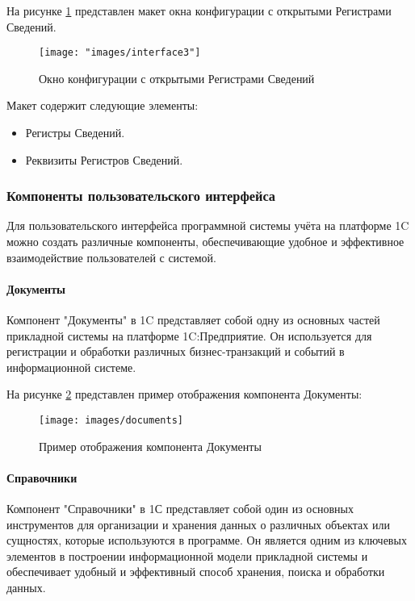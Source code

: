 На рисунке \ref{fig:-interface3} представлен макет окна конфигурации с открытыми Регистрами Сведений.
\begin{figure}
	\centering
	\texttt{[image: "images/interface3"]}
	\caption{Окно конфигурации с открытыми Регистрами Сведений}
	\label{fig:-interface3}
\end{figure}

Макет содержит следующие элементы:
\begin{itemize}
	\item Регистры Сведений.
	\item Реквизиты Регистров Сведений.
\end{itemize}

\subsubsection{Компоненты пользовательского интерфейса}

Для пользовательского интерфейса программной системы учёта на платформе 1C можно создать различные компоненты, обеспечивающие удобное и эффективное взаимодействие пользователей с системой.

\paragraph{Документы}

Компонент "Документы" в 1C представляет собой одну из основных частей прикладной системы на платформе 1C:Предприятие. Он используется для регистрации и обработки различных бизнес-транзакций и событий в информационной системе.

На рисунке \ref{fig:documents} представлен пример отображения компонента Документы:
\begin{figure}
	\centering
	\texttt{[image: images/documents]}
	\caption{Пример отображения компонента Документы}
	\label{fig:documents}
\end{figure}

\paragraph{Справочники}

Компонент "Справочники" в 1С представляет собой один из основных инструментов для организации и хранения данных о различных объектах или сущностях, которые используются в программе. Он является одним из ключевых элементов в построении информационной модели прикладной системы и обеспечивает удобный и эффективный способ хранения, поиска и обработки данных.

